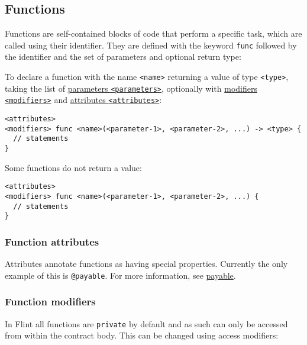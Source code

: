 \subsection{Functions}
\label{sec:appendix-b-functions}

Functions are self-contained blocks of code that perform a specific task, which are called using their identifier. They are defined with the keyword \texttt{func} followed by the identifier and the set of parameters and optional return type:

To declare a function with the name \texttt{<name>} returning a value of type \texttt{<type>}, taking the list of \hyperref[sec:appendix-b-function-parameters]{parameters \texttt{<parameters>}}, optionally with \hyperref[sec:appendix-b-function-modifiers]{modifiers \texttt{<modifiers>}} and \hyperref[sec:appendix-b-function-attributes]{attributes \texttt{<attributes>}}:

\begin{verbatim}
<attributes>
<modifiers> func <name>(<parameter-1>, <parameter-2>, ...) -> <type> {
  // statements
}
\end{verbatim}

Some functions do not return a value:

\begin{verbatim}
<attributes>
<modifiers> func <name>(<parameter-1>, <parameter-2>, ...) {
  // statements
}
\end{verbatim}

\subsubsection{Function attributes}
\label{sec:appendix-b-function-attributes}

Attributes annotate functions as having special properties. Currently the only example of this is \texttt{@payable}. For more information, see \hyperref[sec:appendix-b-payable]{payable}.

\subsubsection{Function modifiers}
\label{sec:appendix-b-function-modifiers}

In Flint all functions are \texttt{private} by default and as such can only be accessed from within the contract body. This can be changed using access modifiers:

